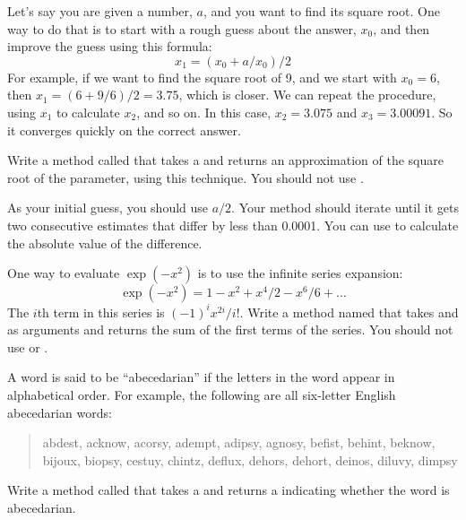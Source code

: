 \begin{exercise}  %

Let's say you are given a number, $a$, and you want to find its square root.
One way to do that is to start with a rough guess about the answer, $x_0$, and then improve the guess using this formula:
%
\[ x_1 =(x_0 + a/x_0) / 2 \]
%
For example, if we want to find the square root of 9, and we start with $x_0 = 6$, then $x_1 = (6 + 9/6) / 2 = 3.75$, which is closer.
We can repeat the procedure, using $x_1$ to calculate $x_2$, and so on.
In this case, $x_2 = 3.075$ and $x_3 = 3.00091$.
So it converges quickly on the correct answer.

Write a method called  that takes a  and returns an approximation of the square root of the parameter, using this technique.
You should not use .

As your initial guess, you should use $a/2$.
Your method should iterate until it gets two consecutive estimates that differ by less than 0.0001.
You can use  to calculate the absolute value of the difference.

\end{exercise}


\begin{exercise}  %

One way to evaluate $\exp(-x^2)$ is to use the infinite series expansion:
%
\[ \exp(-x^2) = 1 - x^2 + x^4/2 - x^6/6 + \ldots \]
%
The $i$th term in this series is $(-1)^i x^{2i} / i!$.
Write a method named  that takes  and  as arguments and returns the sum of the first  terms of the series.
You should not use  or .

\end{exercise}


\begin{exercise}  %


A word is said to be ``abecedarian'' if the letters in the word appear in alphabetical order.
For example, the following are all six-letter English abecedarian words:

\begin{quote}
abdest, acknow, acorsy, adempt, adipsy, agnosy, befist, behint, %
beknow, bijoux, biopsy, cestuy, chintz, deflux, dehors, dehort, %
deinos, diluvy, dimpsy %
\end{quote}

Write a method called  that takes a  and returns a  indicating whether the word is abecedarian.

\end{exercise}


